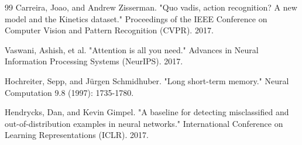 \documentclass[conference]{IEEEtran}
\begin{document}
\begin{thebibliography}{99}
Carreira, Joao, and Andrew Zisserman. "Quo vadis, action recognition? A new model and the Kinetics dataset." Proceedings of the IEEE Conference on Computer Vision and Pattern Recognition (CVPR). 2017.

Vaswani, Ashish, et al. "Attention is all you need." Advances in Neural Information Processing Systems (NeurIPS). 2017.

Hochreiter, Sepp, and Jürgen Schmidhuber. "Long short-term memory." Neural Computation 9.8 (1997): 1735-1780.

Hendrycks, Dan, and Kevin Gimpel. "A baseline for detecting misclassified and out-of-distribution examples in neural networks." International Conference on Learning Representations (ICLR). 2017.

\end{thebibliography}
\end{document}
